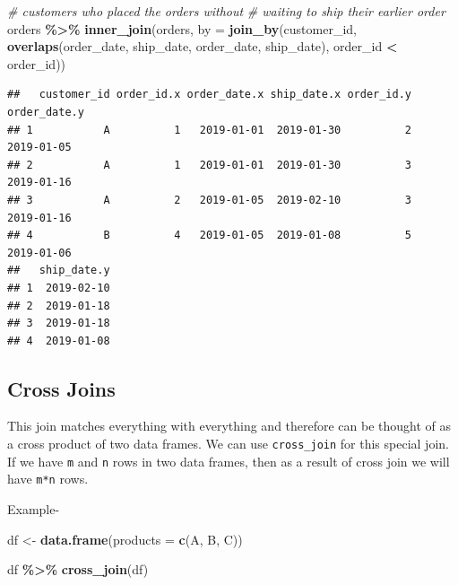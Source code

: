 \documentclass[
]{book}
\newenvironment{Shaded}{\begin{snugshade}}{\end{snugshade}}
\newcommand{\AttributeTok}[1]{\textcolor[rgb]{0.13,0.29,0.53}{#1}}
\newcommand{\CommentTok}[1]{\textcolor[rgb]{0.56,0.35,0.01}{\textit{#1}}}
\newcommand{\FunctionTok}[1]{\textcolor[rgb]{0.13,0.29,0.53}{\textbf{#1}}}
\newcommand{\NormalTok}[1]{#1}
\newcommand{\OtherTok}[1]{\textcolor[rgb]{0.56,0.35,0.01}{#1}}
\newcommand{\SpecialCharTok}[1]{\textcolor[rgb]{0.81,0.36,0.00}{\textbf{#1}}}
\newcommand{\StringTok}[1]{\textcolor[rgb]{0.31,0.60,0.02}{#1}}
\begin{document}
\begin{Shaded}
\begin{Highlighting}[]
\CommentTok{\# customers who placed the orders without}
\CommentTok{\# waiting to ship their earlier order}
\NormalTok{orders }\SpecialCharTok{\%\textgreater{}\%} 
  \FunctionTok{inner\_join}\NormalTok{(orders,}
             \AttributeTok{by =} \FunctionTok{join\_by}\NormalTok{(customer\_id,}
                          \FunctionTok{overlaps}\NormalTok{(order\_date, ship\_date, order\_date, ship\_date),}
\NormalTok{                          order\_id }\SpecialCharTok{\textless{}}\NormalTok{ order\_id)) }
\end{Highlighting}
\end{Shaded}

\begin{verbatim}
##   customer_id order_id.x order_date.x ship_date.x order_id.y order_date.y
## 1           A          1   2019-01-01  2019-01-30          2   2019-01-05
## 2           A          1   2019-01-01  2019-01-30          3   2019-01-16
## 3           A          2   2019-01-05  2019-02-10          3   2019-01-16
## 4           B          4   2019-01-05  2019-01-08          5   2019-01-06
##   ship_date.y
## 1  2019-02-10
## 2  2019-01-18
## 3  2019-01-18
## 4  2019-01-08
\end{verbatim}

\hypertarget{cross-joins}{%
\subsection{Cross Joins}\label{cross-joins}}

This join matches everything with everything and therefore can be thought of as a cross product of two data frames. We can use \texttt{cross\_join} for this special join. If we have \texttt{m} and \texttt{n} rows in two data frames, then as a result of cross join we will have \texttt{m*n} rows.

Example-

\begin{Shaded}
\begin{Highlighting}[]
\NormalTok{df }\OtherTok{\textless{}{-}} \FunctionTok{data.frame}\NormalTok{(}\AttributeTok{products =} \FunctionTok{c}\NormalTok{(}\StringTok{\textquotesingle{}A\textquotesingle{}}\NormalTok{, }\StringTok{\textquotesingle{}B\textquotesingle{}}\NormalTok{, }\StringTok{\textquotesingle{}C\textquotesingle{}}\NormalTok{))}

\NormalTok{df }\SpecialCharTok{\%\textgreater{}\%} 
  \FunctionTok{cross\_join}\NormalTok{(df)}
\end{Highlighting}
\end{Shaded}
\end{document}
